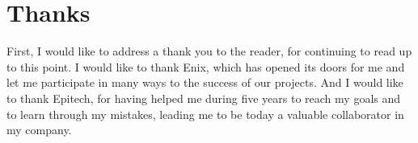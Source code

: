 \section*{Thanks}

First, I would like to address a thank you to the reader, for continuing to read up to this point. I would like to thank Enix, which has opened its doors for me and let me participate in many ways to the success of our projects. And I would like to thank Epitech, for having helped me during five years to reach my goals and to learn through my mistakes, leading me to be today a valuable collaborator in my company.

\clearpage
